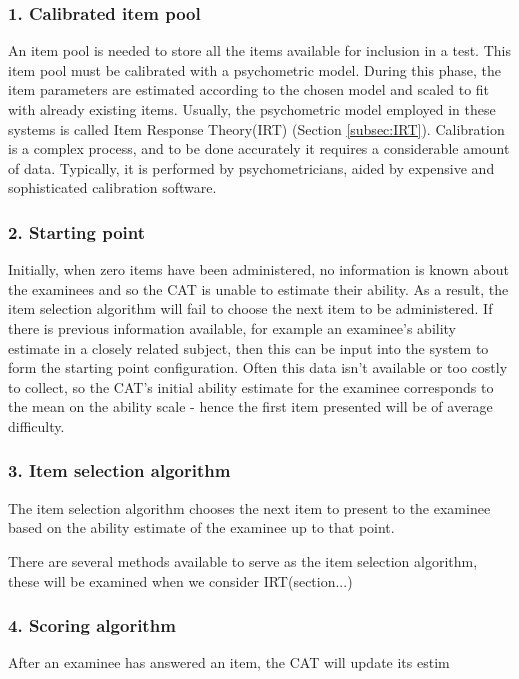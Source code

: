\subsubsection{1. Calibrated item pool}
An item pool is needed to store all the items available for inclusion in a test. This item pool must be calibrated with a psychometric model. During this phase, the item parameters are estimated according to the chosen model and scaled to fit with already existing items. Usually, the psychometric model employed in these systems is called Item Response Theory(IRT) (Section \ref{subsec:IRT}). Calibration is a complex process, and to be done accurately it requires a considerable amount of data. Typically, it is performed by psychometricians, aided by expensive and sophisticated calibration software.

\subsubsection{2. Starting point}
Initially, when zero items have been administered, no information is known about the examinees and so the CAT is unable to estimate their ability. As a result, the item selection algorithm will fail to choose the next item to be administered.
If there is previous information available, for example an examinee's ability estimate in a closely related subject, then this can be input into the system to form the starting point configuration. Often this data isn't available or too costly to collect, so the CAT's initial ability estimate for the examinee corresponds to the mean on the ability scale - hence the first item presented will be of average difficulty.

\subsubsection{3. Item selection algorithm}
The item selection algorithm chooses the next item to present to the examinee based on the ability estimate of the examinee up to that point.

There are several methods available to serve as the item selection algorithm, these will be examined when we consider IRT(section...)

\subsubsection{4. Scoring algorithm}
After an examinee has answered an item, the CAT will update its estim

